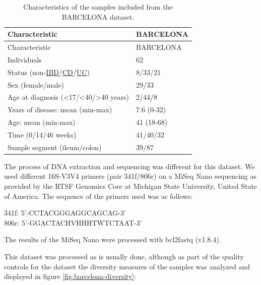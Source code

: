 \documentclass[
  12pt,
  a4paper,
  twoside,
  openright]{book}
\begin{document}
\begin{longtable}[]{@{}ll@{}}
\caption{\label{tab:BARCELONA} Characteristics of the samples included from the BARCELONA dataset.}\tabularnewline
\toprule
Characteristic & BARCELONA \\
\midrule
\endfirsthead
\toprule
Characteristic & BARCELONA \\
\midrule
\endhead
Individuals & 62 \\
Status (non-\protect\hyperlink{acronyms_IBD}{IBD}/\protect\hyperlink{acronyms_CD}{CD}/\protect\hyperlink{acronyms_UC}{UC}) & 8/33/21 \\
Sex (female/male) & 29/33 \\
Age at diagnosis (\textless17/\textless40/\textgreater40 years) & 2/44/8 \\
Years of disease: mean (min-max) & 7.6 (0-32) \\
Age: mean (min-max) & 41 (18-68) \\
Time (0/14/46 weeks) & 41/40/32 \\
Sample segment (ileum/colon) & 39/87 \\
\bottomrule
\end{longtable}

The process of DNA extraction and sequencing was different for this dataset.
We used different 16S-V3V4 primers (pair 341f/806r) on a MiSeq Nano sequencing as provided by the RTSF Genomics Core at Michigan State University, United State of America.
The sequence of the primers used was as follows:

341f: 5'-CCTACGGGAGGCAGCAG-3'\\
806r: 5'-GGACTACHVHHHTWTCTAAT-3'

The results of the MiSeq Nano were processed with bcl2fastq (v1.8.4).

This dataset was processed as is usually done, although as part of the quality controls for the dataset the diversity measures of the samples was analyzed and displayed in figure \ref{fig:barcelona-diversity}:
\end{document}
